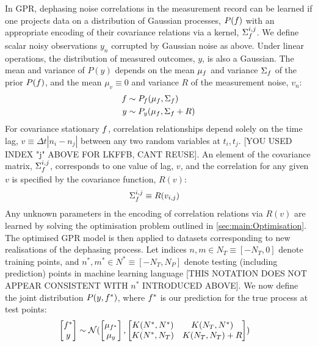 \documentclass[pra, reprint]{revtex4-1}
\begin{document}
In GPR, dephasing noise correlations in the measurement record can be learned if one projects data on a distribution of Gaussian processes, $P(f)$ with an appropriate encoding of their covariance relations via a kernel, $\Sigma_f^{i,j}$. We define scalar noisy observations $y_{n}$ corrupted by Gaussian noise as above.  %
Under linear operations, the distribution of measured outcomes, $y$, is also a Gaussian. The  mean and variance of $P(y)$  depends on the mean $\mu_f$ and variance $\Sigma_f$ of the prior $P(f)$, and the mean $\mu_v \equiv 0$ and variance $R$ of the measurement noise, $v_n$: 
\begin{align}
f & \sim P_f(\mu_f,\Sigma_f ) \\
y & \sim P_y(\mu_f,\Sigma_f + R ) 
\end{align}
For covariance stationary $f$, correlation relationships depend solely on the time lag, $v \equiv \Delta t|n_i - n_j|$ between any two random variables at $t_i, t_j$.  [YOU USED INDEX "j" ABOVE FOR LKFFB, CANT REUSE].  An element of the covariance matrix, $\Sigma_f^{i,j}$, corresponds to one value of lag, $v$, and the correlation for any given $v$  is specified by the covariance function, $R(v)$:
\begin{align}
\Sigma_f^{i,j} & \equiv R(v_{i,j}) 
\end{align}
Any unknown parameters in the encoding of correlation relations via $R(v)$ are learned by solving the optimisation problem outlined in \cref{sec:main:Optimisation}. The optimised GPR model is then applied to datasets corresponding to new realisations of the dephasing process. Let indices $n,m \in N_T \equiv [-N_T, 0]$ denote training points, and $n^*,m^* \in N^* \equiv [-N_T, N_P]$ denote testing (including prediction) points in machine learning language [THIS NOTATION DOES NOT APPEAR CONSISTENT WITH $n^{*}$ INTRODUCED ABOVE]. We now define the joint distribution $P(y,f^*)$, where $f^*$ is our prediction for the true process at test points: 
\begin{align}
\begin{bmatrix} f^* \\y \end{bmatrix} & \sim \mathcal{N} (\begin{bmatrix} \mu_{f^*} \\ \mu_y
\end{bmatrix} , \begin{bmatrix}   K(N^*,N^*)&K(N_T,N^*) \\ K(N^*,N_T) & K(N_T,N_T) + R \end{bmatrix} )
\end{align}
\end{document}
